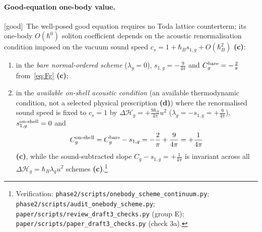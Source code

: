 \documentclass[11pt,a4paper]{article}
\newcommand{\lab}[1]{{\normalfont\sffamily\footnotesize\bfseries(#1)}}
\newcommand{\Lc}{\lab{c}}
\newcommand{\Ld}{\lab{d}}
\newcommand{\eqtag}[2]{{\normalfont\sffamily\footnotesize\textcolor{#1}{[#2]}}}
\newcommand{\Good}{\eqtag{teal!70!black}{good}}
\newcommand{\scr}[1]{\nolinkurl{#1}}
\newcommand{\chk}[1]{\footnote{\raggedright Verification: #1.}}
\newcommand{\hb}{\hbar}
\theoremstyle{remark}
\begin{document}
\paragraph{Good-equation one-body value.} \Good\ The well-posed good equation requires no Toda lattice counterterm; its one-body $O(\hb^0)$ soliton coefficient depends on the acoustic renormalisation condition imposed on the vacuum sound speed $c_s=1+\hb_B s_{1,g}+O(\hb_B^2)$ \Lc:
\begin{enumerate}
\item in the \emph{bare normal-ordered scheme} ($\lambda_g=0$), $s_{1,g}=-\frac9{4\pi}$ and $C_g^{\rm bare}=-\frac2\pi$ from~\eqref{eq:Fg} \Lc;
\item in the \emph{available on-shell acoustic condition} (an available thermodynamic condition, not a selected physical prescription \Ld) where the renormalised sound speed is fixed to $c_s=1$ by $\Delta\mathcal H_g=+\frac{9\hb_B}{4\pi}u^2$ ($\lambda_g=-s_{1,g}=+\frac9{4\pi}$), $s_{1,g}^{\rm on\text{-}shell}=0$ and
\begin{equation}\label{eq:Cgonshell}
C_g^{\rm on\text{-}shell}=C_g^{\rm bare}-s_{1,g}=-\frac2\pi+\frac9{4\pi}=+\frac1{4\pi}
\end{equation}
\Lc, while the sound-subtracted slope $C_g-s_{1,g}=+\frac1{4\pi}$ is invariant across all $\Delta\mathcal H_g=\hb_B\lambda_g u^2$ schemes \Lc.\chk{\scr{phase2/scripts/onebody_scheme_continuum.py}; \scr{phase2/scripts/audit_onebody_scheme.py}; \scr{paper/scripts/review_draft3_checks.py} (group E); \scr{paper/scripts/paper_draft3_checks.py} (check 3a)}
\end{enumerate}
\end{document}
